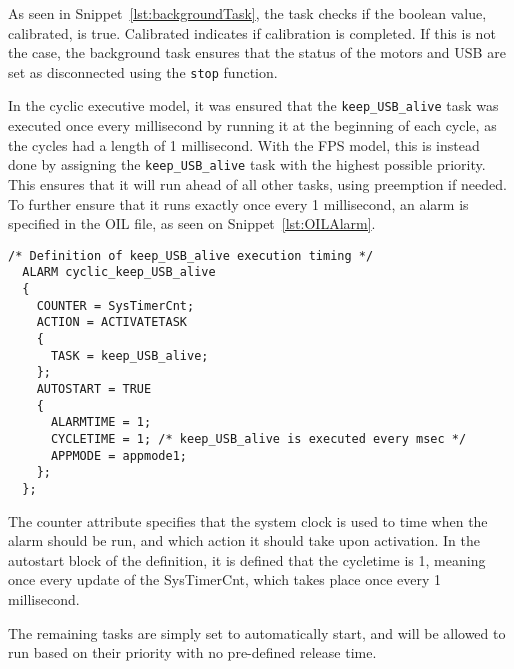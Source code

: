 As seen in Snippet~\ref{lst:backgroundTask}, the task checks if the boolean value, calibrated, is true.
Calibrated indicates if calibration is completed.
If this is not the case, the background task ensures that the status of the motors and USB are set as disconnected using the \texttt{stop} function.

In the cyclic executive model, it was ensured that the \texttt{keep\_USB\_alive} task was executed once every millisecond by running it at the beginning of each cycle, as the cycles had a length of 1 millisecond.
With the FPS model, this is instead done by assigning the \texttt{keep\_USB\_alive} task with the highest possible priority.
This ensures that it will run ahead of all other tasks, using preemption if needed.
To further ensure that it runs exactly once every 1 millisecond, an alarm is specified in the OIL file, as seen on Snippet~\ref{lst:OILAlarm}.

\begin{lstlisting}[language=CSharp,label={lst:OILAlarm},caption={Alarm in the OIL}]
  /* Definition of keep_USB_alive execution timing */
  ALARM cyclic_keep_USB_alive
  {
    COUNTER = SysTimerCnt;
    ACTION = ACTIVATETASK
    {
      TASK = keep_USB_alive;
    };
    AUTOSTART = TRUE
    {
      ALARMTIME = 1;
      CYCLETIME = 1; /* keep_USB_alive is executed every msec */
      APPMODE = appmode1;
    };
  };
\end{lstlisting}

The counter attribute specifies that the system clock is used to time when the alarm should be run, and which action it should take upon activation.
In the autostart block of the definition, it is defined that the cycletime is 1, meaning once every update of the SysTimerCnt, which takes place once every 1 millisecond.

The remaining tasks are simply set to automatically start, and will be allowed to run based on their priority with no pre-defined release time.
